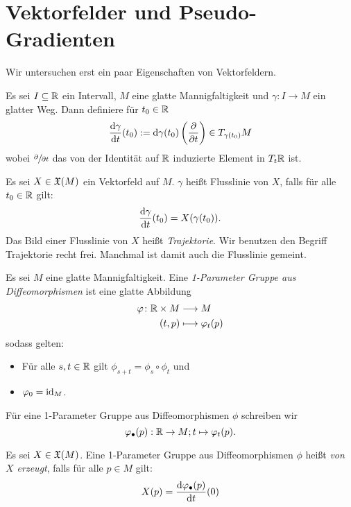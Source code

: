 \section{Vektorfelder und Pseudo-Gradienten}

Wir untersuchen erst ein paar Eigenschaften von Vektorfeldern.

\begin{definition}[Flusslinie]
    \label{def: flussliene}
    Es sei $I \subseteq { \mathbb R }$ ein Intervall, $M$ eine glatte Mannigfaltigkeit und  
    $\gamma \colon I  \to M$ ein glatter Weg. Dann definiere für $t_0 \in { \mathbb R }$
    \[ \derive[\gamma]{t} (t_0) := 
        \opd \gamma (t_0) \left( \pderive{t} \right) \in T_{\gamma(t_0)}M \]
    wobei $\pderive{t}$ das von der Identität auf ${ \mathbb R }$ induzierte Element in $T_t{ \mathbb R }$ ist.

    Es sei $X \in { \mathfrak{X} } (M)$ ein Vektorfeld auf $M$. $\gamma$ heißt Flusslinie von $X$,
    falls für alle $t_0 \in { \mathbb R }$ gilt: 
    \[ \derive[\gamma]{t}(t_0) = X(\gamma(t_0)) . \]
    Das Bild einer Flusslinie von $X$ heißt \textit{Trajektorie}. Wir benutzen den Begriff 
    Trajektorie recht frei. Manchmal ist damit auch die Flusslinie gemeint.
\end{definition}

\begin{definition}
    \label{def: 1-parameter gruppe aus diffeos}
    Es sei $M$ eine glatte Mannigfaltigkeit. Eine 
    \textit{1-Parameter Gruppe aus Diffeomorphismen} ist eine glatte Abbildung
    \begin{align*}
        \varphi \colon { \mathbb R } \times M \longrightarrow & \; M \\
        (t, p) \longmapsto & \; \varphi_t(p)
    \end{align*}
    sodass gelten: 
    \begin{itemize}
        \item Für alle $s, t \in { \mathbb R }$ gilt $\phi_{s + t} = \phi_s \circ \phi_t$ und
        \item $\varphi_0 = { \operatorname{id} }_{M}$.
    \end{itemize}

    Für eine 1-Parameter Gruppe aus Diffeomorphismen $\phi$ schreiben wir 
    \[ \varphi_{\bullet}(p): { \mathbb R } \to M ; t \mapsto \varphi_t(p) . \]

    Es sei $X \in { \mathfrak{X} } (M)$. Eine 1-Parameter Gruppe aus Diffeomorphismen $\phi$ heißt 
    \textit{von $X$ erzeugt}, falls für alle $p \in M$ gilt:
    \[ X(p) = \derive[\phi_{\bullet}(p)]{t}(0) \]
\end{definition}

